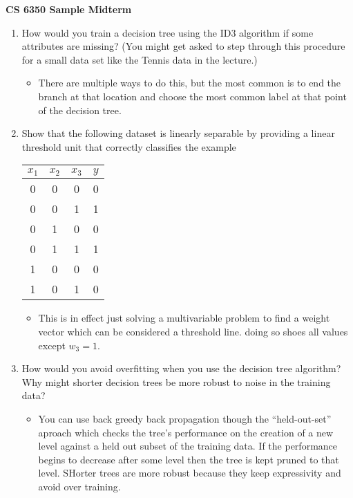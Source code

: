 \documentclass{article}
\begin{document}
\begin{center}
{\huge \bf CS 6350 Sample Midterm}
\end{center}

\begin{enumerate}
\item How would you train a decision tree using the ID3 algorithm if some attributes are missing? (You might get asked to step through this procedure for a small data set like the Tennis data in the lecture.)

	\begin{itemize}
	\item There are multiple ways to do this, but the most common is to end the branch at that location and choose the most common label at that point of the decision tree.
	\end{itemize}


\item Show that the following dataset is linearly separable by providing a linear threshold unit that correctly classifies the example
\begin{center}
\begin{tabular}{|ccc | c |}
\hline
$x_{1}$ & $x_{2}$ & $x_{3}$ & $y$\\
\hline
0 & 0 & 0 & 0\\
0 & 0 & 1 & 1\\
0 & 1 & 0 & 0\\
0 & 1 & 1 & 1\\
1 & 0 & 0 & 0\\
1 & 0 & 1 & 0\\
\hline
\end{tabular}
\end{center}

	\begin{itemize}
	\item This is in effect just solving a multivariable problem to find a weight vector which can be considered a threshold line. doing so shoes all values except $w_3 = 1$. 
	\end{itemize}


\item How would you avoid overfitting when you use the decision tree algorithm? Why might shorter decision trees be more robust to noise in the training data?

	\begin{itemize}
	\item You can use back greedy back propagation though the ``held-out-set'' aproach which checks the tree's performance on the creation of a new level against a held out subset of the training data. If the performance begins to decrease after some level then the tree is kept pruned to that level. SHorter trees are more robust because they keep expressivity and avoid over training.
	\end{itemize}




\end{enumerate}
\end{document}
